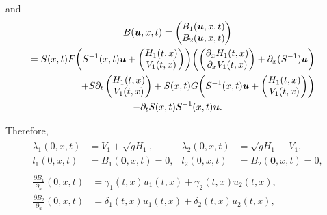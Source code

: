 \documentclass[JEP,XML,SOM,Unicode]{cedram}
\theoremstyle{definition}
\begin{document}
\par\noindent
\vspace*{-5pt}and\vspace*{-5pt}\enlargethispage{\baselineskip}%
\begin{multline}
\label{defB}
B(\boldsymbol{u},x,t)=\begin{pmatrix}B_{1}(\boldsymbol{u},x,t)\\B_{2}(\boldsymbol{u},x,t)\end{pmatrix}
\\
\shoveright{=S(x,t)F\biggl(S^{-1}(x,t)\boldsymbol{u}+\begin{pmatrix}H_{1}(t,x)\\V_{1}(t,x)\end{pmatrix}\biggr)\biggl(\begin{pmatrix} \partial_{x}H_{1}(t,x)\\ \partial_{x}V_{1}(t,x)\end{pmatrix}+\partial_{x}(S^{-1})\boldsymbol{u}\biggr)}\\
\shoveright{+S\partial_{t}\begin{pmatrix}H_{1}(t,x)\\V_{1}(t,x)\end{pmatrix}+S(x,t)G\biggl(S^{-1}(x,t)\boldsymbol{u}+\begin{pmatrix}H_{1}(t,x)\\V_{1}(t,x)\end{pmatrix}\biggr)}\\
-\partial_{t}S(x,t)S^{-1}(x,t)\boldsymbol{u}.
\end{multline}
\par\noindent
\vspace*{-3pt}Therefore,\vspace*{-2pt}
\begin{gather}
\begin{aligned}
\lambda_{1}(0,x,t)&=V_{1}+\sqrt{gH_{1}},&\lambda_{2}(0,x,t)&=\sqrt{gH_{1}}-V_{1}\label{Lambda},\\
l_{1}(0,x,t)&=B_{1}(\boldsymbol{0},x,t)=0,& l_{2}(0,x,t)&=B_{2}(\boldsymbol{0},x,t)=0,
\end{aligned}
\\
\begin{split}
\frac{\partial{B}_{1}}{\partial_{u}}(0,x,t)&=\gamma_{1}(t,x)u_{1}(t,x)+\gamma_{2}(t,x)u_{2}(t,x),\\
\frac{\partial{B}_{2}}{\partial_{u}}(0,x,t)&=\delta_{1}(t,x)u_{1}(t,x)+\delta_{2}(t,x)u_{2}(t,x),
\end{split}
\label{l1l2}
\end{gather}
\end{document}
